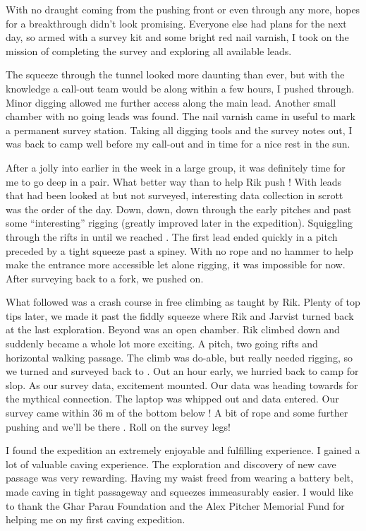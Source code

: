 With no draught coming from the pushing front or even through  any more, hopes for a breakthrough didn't look promising.
Everyone else had plans for the next day, so armed with a survey kit and
some bright red nail varnish, I took on the mission of completing the
survey and exploring all available leads.

The squeeze through the tunnel looked more daunting than ever, but with
the knowledge a call-out team would be along within a few hours, I
pushed through. Minor digging allowed me further access along the main
lead. Another small chamber with no going leads was found. The nail
varnish came in useful to mark a permanent survey station. Taking all
digging tools and the survey notes out, I was back to camp well before
my call-out and in time for a nice rest in the sun.

After a jolly into  earlier in the week in a large group,
it was definitely time for me to go deep in a pair. What better way than
to help Rik push ! With leads that had been looked at
but not surveyed, interesting data collection in scrott was the order of
the day. Down, down, down through the early  pitches and
past some ``interesting'' rigging (greatly improved later in the
expedition). Squiggling through the rifts in  until we reached
. The first lead ended quickly in a pitch preceded by a
tight squeeze past a spiney. With no rope and no hammer to help make the
entrance more accessible let alone rigging, it was impossible for now.
After surveying back to a fork, we pushed on.

What followed was a crash course in free climbing as taught by Rik.
Plenty of top tips later, we made it past the fiddly squeeze where Rik
and Jarvist turned back at the last exploration. Beyond was an open
chamber. Rik climbed down and suddenly  became a whole
lot more exciting. A pitch, two going rifts and horizontal walking
passage. The climb was do-able, but really needed rigging, so we turned
and surveyed back to . Out an hour early, we hurried
back to camp for slop. As our survey data, excitement mounted. Our data
was heading towards  for the mythical connection. The
laptop was whipped out and data entered. Our survey came within 36 m of
the bottom  below ! A bit of rope and some further pushing
and we'll be there . Roll on the survey legs!

I found the expedition an extremely enjoyable and fulfilling experience.
I gained a lot of valuable caving experience. The exploration and
discovery of new cave passage was very rewarding. Having my waist freed
from wearing a battery belt, made caving in tight passageway and
squeezes immeasurably easier. I would like to thank the Ghar Parau
Foundation and the Alex Pitcher Memorial Fund for helping me on my first
caving expedition.

